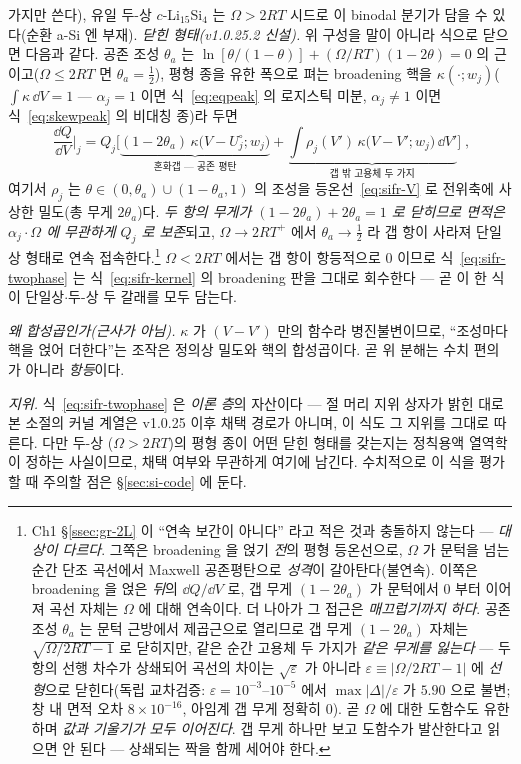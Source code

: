 \begin{warnbox}
가지만 쓴다), 유일 두-상 $c$-Li$_{15}$Si$_4$ 는 $\Omega>2RT$ 시드로 이 binodal 분기가 담을 수 있다(순환 a-Si 엔 부재).
\emph{닫힌 형태(v1.0.25.2 신설).} 위 구성을 말이 아니라 식으로 닫으면 다음과 같다. 공존 조성 $\theta_a$ 는
$\ln[\theta/(1-\theta)]+(\Omega/RT)(1-2\theta)=0$ 의 근이고($\Omega\!\le\!2RT$ 면 $\theta_a{=}\tfrac12$),
평형 종을 유한 폭으로 펴는 broadening 핵을 $\kappa(\cdot;w_j)$($\int\kappa\,\dd V=1$ --- $\alpha_j{=}1$ 이면
식~\eqref{eq:eqpeak} 의 로지스틱 미분, $\alpha_j\ne1$ 이면 식~\eqref{eq:skewpeak} 의 비대칭 종)라 두면
\begin{equation}
\boxed{\;\frac{\dd Q}{\dd V}\bigg|_{j}
=Q_j\Big[\underbrace{(1-2\theta_a)\,\kappa\big(V-U^\circ_j;w_j\big)}_{\text{혼화갭 --- 공존 평탄}}
+\underbrace{\int \rho_j(V')\,\kappa\big(V-V';w_j\big)\,\dd V'}_{\text{갭 밖 고용체 두 가지}}\Big]\;,}
\label{eq:sifr-twophase}
\end{equation}
여기서 $\rho_j$ 는 $\theta\!\in\!(0,\theta_a)\cup(1-\theta_a,1)$ 의 조성을 등온선~\eqref{eq:sifr-V} 로 전위축에
사상한 밀도(총 무게 $2\theta_a$)다. \emph{두 항의 무게가 $ (1-2\theta_a)+2\theta_a=1$ 로 닫히므로 면적은
$\alpha_j\cdot\Omega$ 에 무관하게 $Q_j$ 로 보존}되고, $\Omega\!\to\!2RT^+$ 에서 $\theta_a\!\to\!\tfrac12$ 라
갭 항이 사라져 단일상 형태로 연속 접속한다.\footnote{Ch1 \S\ref{ssec:gr-2L} 이 ``연속 보간이 아니다''
라고 적은 것과 충돌하지 않는다 --- \emph{대상이 다르다}. 그쪽은 broadening 을 얹기 \emph{전}의 평형
등온선으로, $\Omega$ 가 문턱을 넘는 순간 단조 곡선에서 Maxwell 공존평탄으로 \emph{성격}이 갈아탄다(불연속).
이쪽은 broadening 을 얹은 \emph{뒤}의 $\dd Q/\dd V$ 로, 갭 무게 $(1-2\theta_a)$ 가 문턱에서 $0$ 부터 이어져
곡선 자체는 $\Omega$ 에 대해 연속이다. 더 나아가 그 접근은 \emph{매끄럽기까지 하다}. 공존
조성 $\theta_a$ 는 문턱 근방에서 제곱근으로 열리므로 갭 무게 $(1-2\theta_a)$ 자체는
$\sqrt{\Omega/2RT-1}$ 로 닫히지만, 같은 순간 고용체 두 가지가 \emph{같은 무게를 잃는다} --- 두 항의
선행 차수가 상쇄되어 곡선의 차이는 $\sqrt\varepsilon$ 가 아니라 $\varepsilon\equiv|\Omega/2RT-1|$ 에
\emph{선형}으로 닫힌다(독립 교차검증: $\varepsilon=10^{-3}$--$10^{-5}$ 에서 $\max|\Delta|/\varepsilon$ 가
$5.90$ 으로 불변; 창 내 면적 오차 $8\times10^{-16}$, 아임계 갭 무게 정확히 $0$). 곧 $\Omega$ 에 대한
도함수도 유한하며 \emph{값과 기울기가 모두 이어진다}. 갭 무게 하나만 보고 도함수가 발산한다고 읽으면 안 된다
--- 상쇄되는 짝을 함께 세어야 한다.} $\Omega\!<\!2RT$ 에서는 갭 항이 항등적으로 0 이므로
식~\eqref{eq:sifr-twophase} 는 식~\eqref{eq:sifr-kernel} 의 broadening 판을 그대로 회수한다 --- 곧 이 한 식이
단일상$\cdot$두-상 두 갈래를 모두 담는다.

\emph{왜 합성곱인가(근사가 아님).} $\kappa$ 가 $(V-V')$ 만의 함수라 병진불변이므로, ``조성마다 핵을 얹어
더한다''는 조작은 정의상 밀도와 핵의 합성곱이다. 곧 위 분해는 수치 편의가 아니라 \emph{항등}이다.

\emph{지위.} 식~\eqref{eq:sifr-twophase} 은 \emph{이론 층}의 자산이다 --- 절 머리 지위 상자가 밝힌 대로
본 소절의 커널 계열은 v1.0.25 이후 채택 경로가 아니며, 이 식도 그 지위를 그대로 따른다. 다만 두-상
($\Omega>2RT$)의 평형 종이 어떤 닫힌 형태를 갖는지는 정칙용액 열역학이 정하는 사실이므로, 채택 여부와
무관하게 여기에 남긴다. 수치적으로 이 식을 평가할 때 주의할 점은 \S\ref{sec:si-code} 에 둔다.
\end{warnbox}

